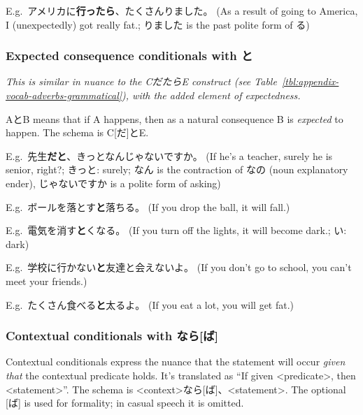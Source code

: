 \documentclass[../nihongo-gakushuu-kyouzai-grammar.tex]{subfiles}
\begin{document}
E.g.\ アメリカに\textbf{行ったら\textlightgrey{[ば]}}、たくさんりました。 (As a result of going to America, I (unexpectedly) got really fat.; りました is the past polite form of る)



\subsubsection{Expected consequence conditionals with と} \label{sec:expected-consequence-conditionals}
\emph{This is similar in nuance to the CだたらE construct (see Table~\ref{tbl:appendix-vocab-adverbs-grammatical}), with the added element of \emph{expectedness}.}

AとB means that if A happens, then as a natural consequence B is \emph{expected} to happen. The schema is C[だ]とE. 

E.g.\ 先生\textbf{だと}、きっとなんじゃないですか。 (If he's a teacher, surely he is senior, right?; きっと: surely; なん is the contraction of なの (noun explanatory ender), じゃないですか is a polite form of asking)

E.g.\ ボールを落とす\textbf{と}落ちる。 (If you drop the ball, it will fall.)

E.g.\ 電気を消す\textbf{と}くなる。 (If you turn off the lights, it will become dark.; い: dark)

E.g.\ 学校に行かない\textbf{と}友達と会えないよ。 (If you don't go to school, you can't meet your friends.)

E.g.\ たくさん食べる\textbf{と}太るよ。 (If you eat a lot, you will get fat.)


\subsubsection{Contextual conditionals with なら[ば]} \label{sec:contextual-conditionals}
Contextual conditionals express the nuance that the statement will occur \emph{given that} the contextual predicate holds. It's translated as ``If given <predicate>, then <statement>''. The schema is <context>なら[ば]、<statement>. The optional [ば] is used for formality; in casual speech it is omitted.
\end{document}
